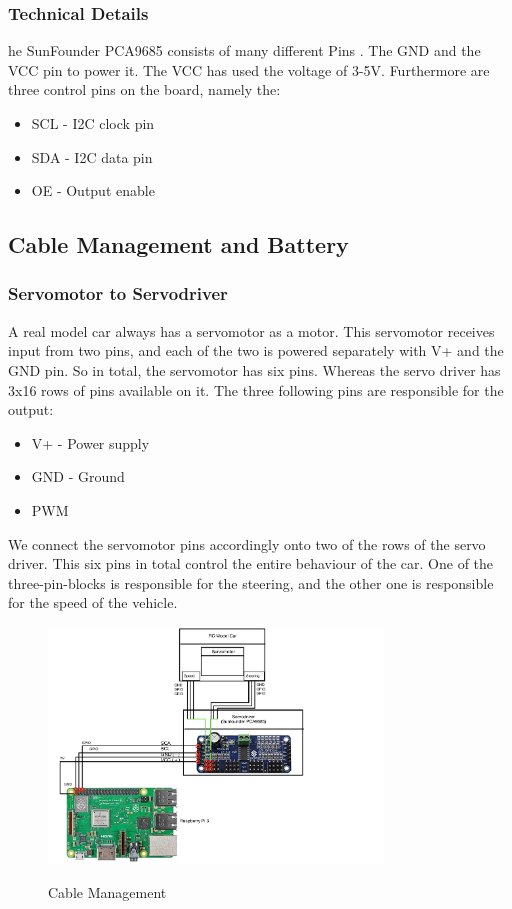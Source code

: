 \documentclass[journal]{IEEEtran}
\begin{document}
\subsubsection{Technical Details}
he SunFounder PCA9685 consists of many different Pins \cite{servo}. The GND and the VCC pin to power it. The VCC has used the voltage of 3-5V. Furthermore are three control pins on the board, namely the:

\begin{itemize}
\item SCL - I2C clock pin
\item SDA - I2C data pin 
\item OE - Output enable 
\end{itemize}

\subsection{Cable Management and Battery}
\subsubsection{Servomotor to Servodriver}
A real model car always has a servomotor as a motor. This servomotor receives input from two pins, and each of the two is powered separately with V+ and the GND pin. 
So in total, the servomotor has six pins. Whereas the servo driver has 3x16 rows of pins available on it.  The three following pins are responsible for the output:

\begin{itemize}
\item V+ - Power supply
\item GND - Ground
\item PWM
\end{itemize}

We connect the servomotor pins accordingly onto two of the rows of the servo driver. This six pins in total control the entire behaviour of the car. One of the three-pin-blocks is responsible for the steering, and the other one is responsible for the speed of the vehicle. \\

\begin{figure}
  \begin{center}
  \includegraphics[width=3.5in]{photo/ebene2.pdf}\\
  \caption{Cable Management}\label{ebene2}
  \end{center}
\end{figure}
\end{document}
